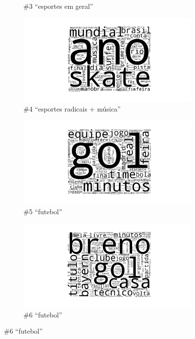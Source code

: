 \documentclass[10pt]{beamer}
\begin{document}
\begin{frame}  [shrink=15]
\begin{figure}[H]
\begin{subfigure}[b]{0.45\textwidth}
            \caption{\#3 ``esportes em geral''}
        \end{subfigure}
        \begin{subfigure}[b]{0.45\textwidth}
            \includegraphics[width=\textwidth]{img/ovnmtf-nc-2-tc-2.png}
            \caption{\#4 ``esportes radicais + música''}
        \end{subfigure}
        \begin{subfigure}[b]{0.45\textwidth}
            \includegraphics[width=\textwidth]{img/ovnmtf-nc-3-tc-1.png}
            \caption{\#5 ``futebol''}
        \end{subfigure}
        \begin{subfigure}[b]{0.45\textwidth}
            \includegraphics[width=\textwidth]{img/ovnmtf-nc-3-tc-2.png}
            \caption{\#6 ``futebol''}
        \end{subfigure}
    \end{figure}


\end{frame}
\end{document}
